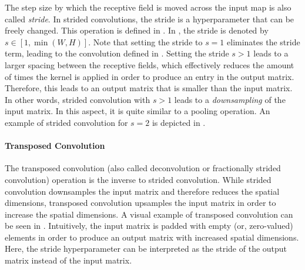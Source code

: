 The step size by which the receptive field is moved across the input map is also called \emph{stride}. In strided convolutions, the stride is a hyperparameter that can be freely changed. This operation is defined in . In , the stride is denoted by $s \in [1,\min(W,H)]$. Note that setting the stride to $s=1$ eliminates the stride term, leading to the convolution defined in . Setting the stride $s>1$ leads to a larger spacing between the receptive fields, which effectively reduces the amount of times the kernel is applied in order to produce an entry in the output matrix. Therefore, this leads to an output matrix that is smaller than the input matrix. In other words, strided convolution with $s>1$ leads to a \emph{downsampling} of the input matrix. In this aspect, it is quite similar to a pooling operation. An example of strided convolution for $s=2$ is depicted in .

\paragraph{Transposed Convolution}
The transposed convolution (also called deconvolution or fractionally strided convolution) operation is the inverse to strided convolution. While strided convolution downsamples the input matrix and therefore reduces the spatial dimensions, transposed convolution upsamples the input matrix in order to increase the spatial dimensions. A visual example of transposed convolution can be seen in . Intuitively, the input matrix is padded with empty (or, zero-valued) elements in order to produce an output matrix with increased spatial dimensions. Here, the stride hyperparameter can be interpreted as the stride of the output matrix instead of the input matrix.

